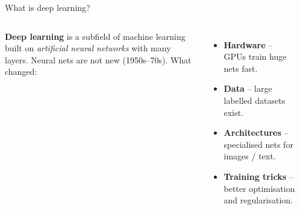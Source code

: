 \documentclass[aspectratio=169]{beamer}
\begin{document}
\begin{frame}{What is deep learning?}
  \begin{columns}[T]
    \textbf{Deep learning} is a subfield of machine learning built on \emph{artificial
    neural networks} with many layers.
    \vskip 6pt
    Neural nets are not new (1950s--70s). What changed:
    \begin{itemize}\small
      \item \textbf{Hardware} -- GPUs train huge nets fast.
      \item \textbf{Data} -- large labelled datasets exist.
      \item \textbf{Architectures} -- specialised nets for images / text.
      \item \textbf{Training tricks} -- better optimisation and regularisation.
    \end{itemize}
    \begin{center}
    \end{center}
  \end{columns}
\end{frame}
\end{document}
